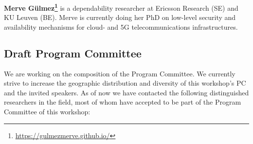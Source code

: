 \documentclass[a4paper,11pt]{article}
\begin{document}
\textbf{Merve
G\"ulmez\footnote{\url{https://gulmezmerve.github.io/}}}
is a dependability researcher at Ericsson Research (SE) and KU Leuven (BE).
Merve is currently doing her PhD on low-level security and availability
mechanisms for cloud- and 5G telecommunications infrastructures.


\subsection{Draft Program Committee}
%
We are working on the composition of the Program Committee. We currently
strive to increase the geographic distribution and diversity of this
workshop's PC and the invited speakers. As of now we have contacted the
following distinguished researchers in the field, most of whom have
accepted to be part of the Program Committee of this workshop:

\end{document}
